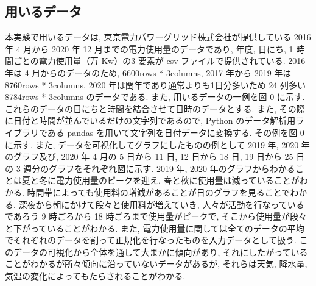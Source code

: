 \subsection{用いるデータ}
本実験で用いるデータは, 東京電力パワーグリッド株式会社が提供している 2016 年 4 月から 2020 年 12 月までの電力使用量のデータであり, 年度, 日にち, 1 時間ごとの電力使用量（万 Kw）の3 要素が csv ファイルで提供されている. 2016 年は 4 月からのデータのため, 6600rows * 3columns, 2017 年から 2019 年は 8760rows * 3columns, 2020 年は閏年であり通常よりも1日分多いため 24 列多い 8784rows * 3columns のデータである. また, 用いるデータの一例を図 0 に示す. これらのデータの日にちと時間を結合させて日時のデータとする. また, その際に日付と時間が並んでいるだけの文字列であるので, Python のデータ解析用ライブラリである pandas を用いて文字列を日付データに変換する. その例を図 0 に示す. また, データを可視化してグラフにしたものの例として 2019 年, 2020 年のグラフ及び,
2020 年 4 月の 5 日から 11 日, 12 日から 18 日, 19 日から 25 日の 3 週分のグラフをそれぞれ図に示す. 
2019 年, 2020 年のグラフからわかることは夏と冬に電力使用量のピークを迎え, 春と秋に使用量は減っていることがわかる. 時間帯によっても使用料の増減があることが日のグラフを見ることでわかる. 深夜から朝にかけて段々と使用料が増えていき, 人々が活動を行なっているであろう 9 時ごろから 18 時ごろまで使用量がピークで, そこから使用量が段々と下がっていることがわかる.
また, 電力使用量に関しては全てのデータの平均でそれぞれのデータを割って正規化を行なったものを入力データとして扱う.
このデータの可視化から全体を通して大まかに傾向があり, それにしたがっていることがわかるが所々傾向に沿っていないデータがあるが, それらは天気, 降水量, 気温の変化によってもたらされることがわかる. 

